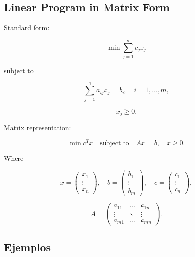 \subsection*{Linear Program in Matrix Form}

Standard form:

\[
\min \sum_{j=1}^{n} c_j x_j
\]

subject to

\[
\sum_{j=1}^{n} a_{ij} x_j = b_i,
\quad i=1,\dots,m,
\]

\[
x_j \ge 0.
\]

Matrix representation:

\[
\min c^T x
\quad \text{subject to}
\quad
Ax = b,
\quad
x \ge 0.
\tag{LP-1}
\]

Where

\[
x =
\begin{pmatrix}
x_1 \\ \vdots \\ x_n
\end{pmatrix},
\quad
b =
\begin{pmatrix}
b_1 \\ \vdots \\ b_m
\end{pmatrix},
\quad
c =
\begin{pmatrix}
c_1 \\ \vdots \\ c_n
\end{pmatrix},
\]

\[
A =
\begin{pmatrix}
a_{11} & \dots & a_{1n} \\
\vdots & \ddots & \vdots \\
a_{m1} & \dots & a_{mn}
\end{pmatrix}.
\]

\subsection{Ejemplos}

